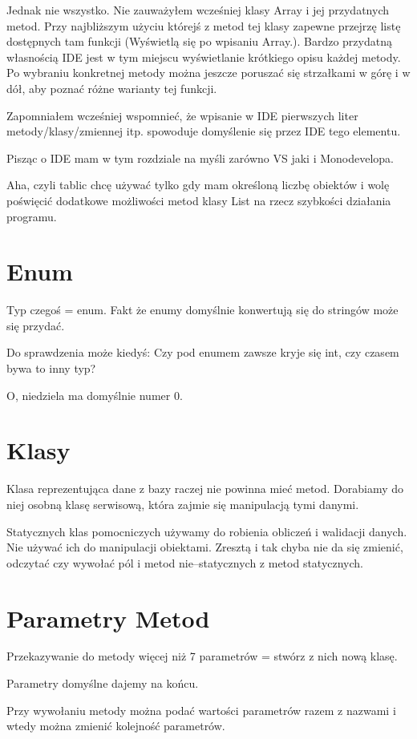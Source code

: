 \documentclass[10pt]{article}
\begin{document}
Jednak nie wszystko. Nie zauważyłem wcześniej klasy Array i jej przydatnych metod. Przy najbliższym użyciu którejś z metod tej klasy zapewne przejrzę listę dostępnych tam funkcji (Wyświetlą się po wpisaniu Array.). Bardzo przydatną własnością IDE jest w tym miejscu wyświetlanie krótkiego opisu każdej metody. Po wybraniu konkretnej metody można jeszcze poruszać się strzałkami w górę i w dół, aby poznać różne warianty tej funkcji.

Zapomniałem wcześniej wspomnieć, że wpisanie w IDE pierwszych liter metody/klasy/zmiennej itp. spowoduje domyślenie się przez IDE tego elementu.

Pisząc o IDE mam w tym rozdziale na myśli zarówno VS jaki i Monodevelopa.

Aha, czyli tablic chcę używać tylko gdy mam określoną liczbę obiektów i wolę poświęcić dodatkowe możliwości metod klasy List na rzecz szybkości działania programu.

\section{Enum}
Typ czegoś = enum. Fakt że enumy domyślnie konwertują się do stringów może się przydać.

Do sprawdzenia może kiedyś: Czy pod enumem zawsze kryje się int, czy czasem bywa to inny typ?

O, niedziela ma domyślnie numer 0.

\section{Klasy}
Klasa reprezentująca dane z bazy raczej nie powinna mieć metod. Dorabiamy do niej osobną klasę serwisową, która zajmie się manipulacją tymi danymi.

Statycznych klas pomocniczych używamy do robienia obliczeń i walidacji danych. Nie używać ich do manipulacji obiektami. Zresztą i tak chyba nie da się zmienić, odczytać czy wywołać pól i metod nie--statycznych z metod statycznych.

\section{Parametry Metod}
Przekazywanie do metody więcej niż 7 parametrów = stwórz z nich nową klasę.

Parametry domyślne dajemy na końcu.

Przy wywołaniu metody można podać wartości parametrów razem z nazwami i wtedy można zmienić kolejność parametrów.
\end{document}
